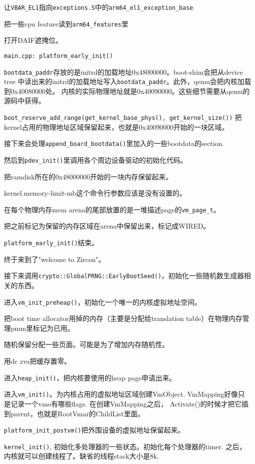 让\verb|VBAR_EL1|指向\verb|exceptions.S|中的\verb|arm64_el1_exception_base|.

把一些cpu feature读到\verb|arm64_features|里

打开DAIF遮掩位。

\verb|main.cpp: platform_early_init()|

\verb|bootdata_paddr|存放的是initrd的加载地址0x48000000。boot-shim会把从device tree
中读出来的initrd的加载地址写入\verb|bootdata_paddr|。此外，qemu会把内核加载到0x40080000处。
内核的实际物理地址就是0x40090000。这些细节需要从qemu的源码中获得。

\verb|boot_reserve_add_range(get_kernel_base_phys(), get_kernel_size())|
把kernel占用的物理地址区域保留起来，也就是0x40090000开始的一块区域。

接下来会处理\verb|append_board_bootdata()|里加入的一些bootdata的section.

然后到\verb|pdev_init()|里调用各个周边设备驱动的初始化代码。

把ramdisk所在的0x48000000开始的一块内存保留起来。

kernel.memory-limit-mb这个命令行参数应该是没有设置的。

在每个物理内存mem arena的尾部放置的是一堆描述page的\verb|vm_page_t|。

把之前标记为保留的内存区域在arena中保留出来，标记成WIRED。

\verb|platform_early_init()|结束。

终于来到了"welcome to Zircon"。

接下来调用\verb|crypto::GlobalPRNG::EarlyBootSeed()|，初始化一些随机数生成器相关的东西。

进入\verb|vm_init_preheap()|，初始化一个唯一的内核虚拟地址空间。

把boot time allocator用掉的内存（主要是分配给translation table）在物理内存管理pmm里标记为已用。

随机保留分配一些页面。可能是为了增加内存随机性。

用dc zva把缓存置零。

进入\verb|heap_init()|，把内核要使用的heap page申请出来。

进入\verb|vm_init()|。为内核占用的虚拟地址区域创建VmObject. VmMapping好像只是记录一个vmo有哪些flags. 在创建VmMapping之后，
Activate()的时候才把它插到parent，也就是RootVmar的ChildList里面。

\verb|platform_init_postvm()|把外围设备的虚拟地址保留起来。

\verb|kernel_init()|, 初始化多处理器的一些状态。初始化每个处理器的timer. 之后，内核就可以创建线程了。缺省的线程stack大小是8k.

